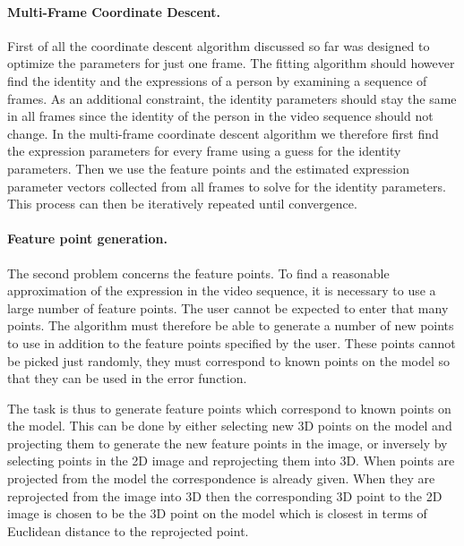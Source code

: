\documentclass[11pt,a4paper]{report}
\begin{document}
\paragraph{Multi-Frame Coordinate Descent.} First of all the coordinate descent algorithm discussed so far was
designed to optimize the parameters for just one frame. The fitting algorithm
should however find the identity and the expressions of a person by examining a
sequence of frames. As an additional constraint, the identity parameters should
stay the same in all frames since the identity of the person in the video
sequence should not change. In the multi-frame coordinate descent algorithm we
therefore first find the expression
parameters for every frame using a guess for the identity parameters. Then we
use the feature points and the estimated expression parameter vectors collected from all frames
to solve for the identity parameters. This process can then be iteratively
repeated until convergence.

\paragraph{Feature point generation.} The second problem concerns the feature
points. To find a reasonable approximation of the expression in the
video sequence, it is necessary to use a large number of feature points. The user cannot
be expected to enter that many points. The algorithm must therefore be able to generate
a number of new points to use in addition to the feature points specified
by the user. These points cannot be picked just randomly, they must correspond
to known points on the model so that they can be used in the error
function. 

The task is thus to generate feature points which
correspond to known points on the model. This can be done by either selecting
new 3D points on the model and projecting them to generate the new feature
points in the image, or
inversely by selecting points in the 2D image and reprojecting them into 3D. When
points are projected from the model the correspondence is already given. When
they are reprojected from the image into 3D then the corresponding 3D point to the 2D image
is chosen to be the 3D point on the model which is closest
in terms of Euclidean distance to the reprojected point.
\end{document}
